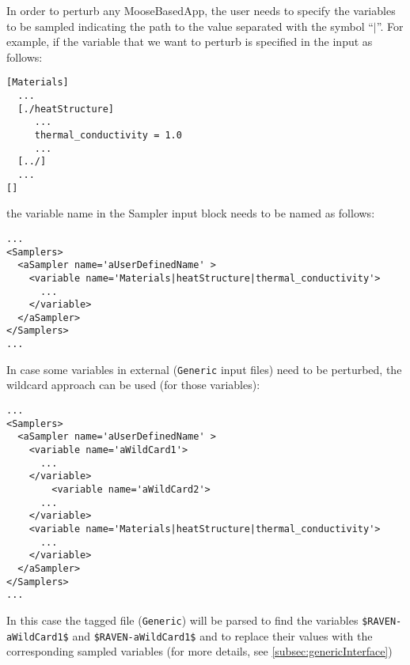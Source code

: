 In order to perturb any MooseBasedApp, the user needs to specify the variables to be
sampled indicating the path to the value separated with the symbol ``$|$''. For example,
if the variable that we want to perturb is specified in the input as follows:
\begin{lstlisting}[style=XML]
[Materials]
  ...
  [./heatStructure]
     ...
     thermal_conductivity = 1.0
     ...
  [../]
  ...
[]
\end{lstlisting}
the variable name in the Sampler input block needs to be named as follows:
\begin{lstlisting}[style=XML]
...
<Samplers>
  <aSampler name='aUserDefinedName' >
    <variable name='Materials|heatStructure|thermal_conductivity'>
      ...
    </variable>
  </aSampler>
</Samplers>
...
\end{lstlisting}
%
In case some variables in external (\texttt{Generic} input files) need to be perturbed,
the wildcard approach can be used (for those variables):
\begin{lstlisting}[style=XML]
...
<Samplers>
  <aSampler name='aUserDefinedName' >
    <variable name='aWildCard1'>
      ...
    </variable>
        <variable name='aWildCard2'>
      ...
    </variable>
    <variable name='Materials|heatStructure|thermal_conductivity'>
      ...
    </variable>
  </aSampler>
</Samplers>
...
\end{lstlisting}
In this case the tagged file (\texttt{Generic}) will be parsed to find the variables
\texttt{\$RAVEN-aWildCard1\$} and \texttt{\$RAVEN-aWildCard1\$} and to replace their values
with the corresponding sampled variables (for more details, see  \ref{subsec:genericInterface})

